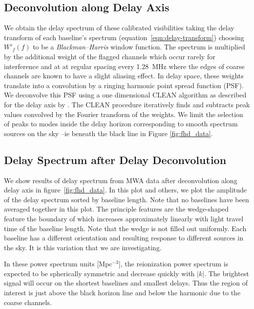 \documentclass[preprint2,iop,numberedappendix]{emulateapj}
\begin{document}
\subsection{Deconvolution along Delay Axis}\label{sec:CLEAN}

We obtain the delay spectrum of these calibrated visibilities taking the delay transform of each baseline's spectrum (equation~\ref{eqn:delay-transform}) choosing $W'_f(f)$ to be a {\it Blackman--Harris} window function. The spectrum is multiplied by  the additional weight of the flagged channels which occur rarely for interference and at at regular spacing every 1.28~MHz where the edges of coarse channels are known to have a slight aliasing effect.  In delay space, these weights translate into a convolution by a ringing harmonic point spread function (PSF).  We deconvolve this PSF using a one dimensional CLEAN algorithm \citep{tay99} as described for the delay axis by \citet{par09,par12}. The CLEAN procedure iteratively finds and subtracts peak values convolved by the Fourier transform of the weights.   We limit the selection of peaks to modes inside the delay horizon corresponding to smooth spectrum sources on the sky --ie beneath the black line in Figure \ref{fig:fhd_data}.  


\subsection{Delay Spectrum after Delay Deconvolution}\label{sec:data-delay-spectrum}

We show results of delay spectrum from MWA data after deconvolution along delay axis in figure~\ref{fig:fhd_data}. In this plot and others, we plot the amplitude of the delay spectrum sorted by baseline length. Note that no baselines have been averaged together in this plot.  The principle features are the wedge-shaped feature the boundary of which increases approximately linearly with light travel time of the baseline length.  Note that the wedge is not filled out uniformly. Each baseline has a different orientation and resulting response to different sources in the sky. It is this variation that we are investigating.

In these power spectrum units [Mpc$^{-3}$], the reionization power spectrum is expected to be spherically symmetric and decrease quickly with $|k|$.  The brightest signal will occur on the shortest baselines and smallest delays. Thus the region of interest is just above the black horizon line and below the harmonic due to the coarse channels.
\end{document}
